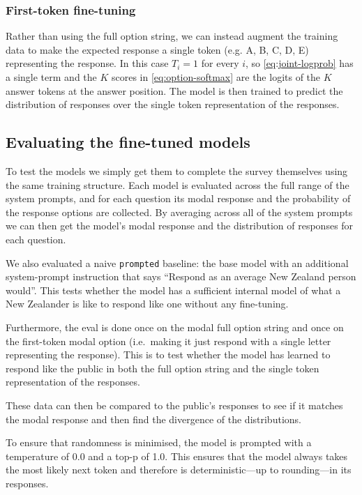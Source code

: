 \subsubsection{First-token fine-tuning}

Rather than using the full option string, we can instead augment the training data to make the expected response a single token (e.g. A, B, C, D, E) representing the response. In this case $T_i = 1$ for every $i$, so \eqref{eq:joint-logprob} has a single term and the $K$ scores in \eqref{eq:option-softmax} are the logits of the $K$ answer tokens at the answer position. The model is then trained to predict the distribution of responses over the single token representation of the responses.

\subsection{Evaluating the fine-tuned models}

To test the models we simply get them to complete the survey themselves using the same training structure. Each model is evaluated across the full range of the system prompts, and for each question its modal response and the probability of the response options are collected. By averaging across all of the system prompts we can then get the model's modal response and the distribution of responses for each question.

We also evaluated a naive \texttt{prompted} baseline: the base model with an additional system-prompt instruction that says ``Respond as an average New Zealand person would''. This tests whether the model has a sufficient internal model of what a New Zealander is like to respond like one without any fine-tuning.

Furthermore, the eval is done once on the modal full option string and once on the first-token modal option (i.e.\ making it just respond with a single letter representing the response). This is to test whether the model has learned to respond like the public in both the full option string and the single token representation of the responses.

These data can then be compared to the public's responses to see if it matches the modal response and then find the divergence of the distributions.

To ensure that randomness is minimised, the model is prompted with a temperature of 0.0 and a top-p of 1.0. This ensures that the model always takes the most likely next token and therefore is deterministic—up to rounding—in its responses.

